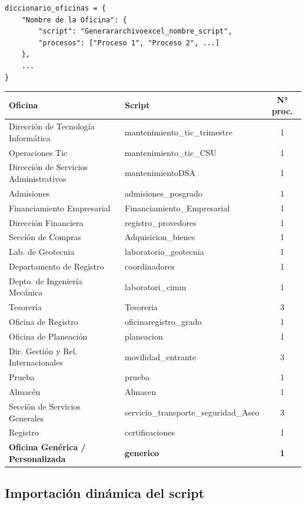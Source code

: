 \documentclass[12pt, letterpaper]{article}
\begin{document}
\begin{lstlisting}[caption={Estructura del diccionario de oficinas}]
diccionario_oficinas = {
    "Nombre de la Oficina": {
        "script": "Generararchivoexcel_nombre_script",
        "procesos": ["Proceso 1", "Proceso 2", ...]
    },
    ...
}
\end{lstlisting}

\begin{center}
\begin{longtable}{>{\small}p{5.5cm} >{\small\ttfamily}p{5cm} >{\small}c}
\toprule
\textbf{Oficina} & \textbf{Script} & \textbf{N° proc.} \\
\midrule
Dirección de Tecnología Informática & mantenimiento\_tic\_trimestre & 1 \\
Operaciones Tic & mantenimiento\_tic\_CSU & 1 \\
Dirección de Servicios Administrativos & mantenimientoDSA & 1 \\
Admisiones & admisiones\_posgrado & 1 \\
Financiamiento Empresarial & Financiamiento\_Empresarial & 1 \\
Dirección Financiera & registro\_provedores & 1 \\
Sección de Compras & Adquisicion\_bienes & 1 \\
Lab. de Geotecnia & laboratorio\_geotecnia & 1 \\
Departamento de Registro & coordinadores & 1 \\
Depto. de Ingeniería Mecánica & laboratori\_cimm & 1 \\
Tesorería & Tesoreria & 3 \\
Oficina de Registro & oficinaregistro\_grado & 1 \\
Oficina de Planeación & planeacion & 1 \\
Dir. Gestión y Rel. Internacionales & movilidad\_entrante & 3 \\
Prueba & prueba & 1 \\
Almacén & Almacen & 1 \\
Sección de Servicios Generales & servicio\_transporte\_seguridad\_Aseo & 3 \\
Registro & certificaciones & 1 \\
\textbf{Oficina Genérica / Personalizada} & \textbf{generico} & \textbf{1} \\
\bottomrule
\end{longtable}
\end{center}

\subsection{Importación dinámica del script}
\end{document}
